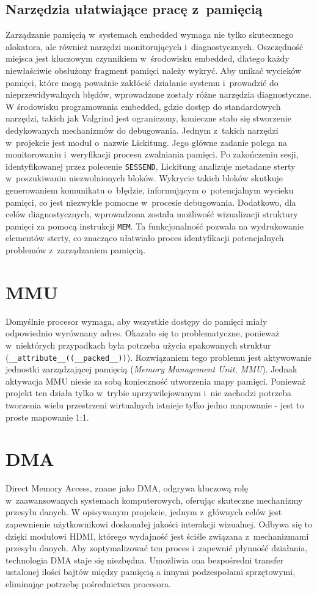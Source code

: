 \documentclass[shortabstract]{iithesis}
\begin{document}
\subsection{Narzędzia ułatwiające pracę z~pamięcią}
Zarządzanie pamięcią w~systemach embedded wymaga nie tylko skutecznego alokatora, ale również narzędzi monitorujących i~diagnostycznych. Oszczędność miejsca jest kluczowym czynnikiem w~środowisku embedded, dlatego każdy niewłaściwie obsłużony fragment pamięci należy wykryć. Aby unikać wycieków pamięci, które mogą poważnie zakłócić działanie systemu i~prowadzić do nieprzewidywalnych błędów, wprowadzone zostały różne narzędzia diagnostyczne.
W środowisku programowania embedded, gdzie dostęp do standardowych narzędzi, takich jak Valgrind jest ograniczony, konieczne stało się stworzenie dedykowanych mechanizmów do debugowania. Jednym z~takich narzędzi w~projekcie jest moduł o~nazwie Lickitung. Jego główne zadanie polega na monitorowaniu i~weryfikacji procesu zwalniania pamięci. Po zakończeniu sesji, identyfikowanej przez polecenie \texttt{SESSEND}, Lickitung analizuje metadane sterty w~poszukiwaniu niezwolnionych bloków. Wykrycie takich bloków skutkuje generowaniem komunikatu o~błędzie, informującym o~potencjalnym wycieku pamięci, co jest niezwykle pomocne w~procesie debugowania.
Dodatkowo, dla celów diagnostycznych, wprowadzona została możliwość wizualizacji struktury pamięci za pomocą instrukcji \texttt{MEM}. Ta funkcjonalność pozwala na wydrukowanie elementów sterty, co znacząco ułatwiało proces identyfikacji potencjalnych problemów z~zarządzaniem pamięcią.

\section{MMU}
 Domyślnie procesor wymaga, aby wszystkie dostępy do pamięci miały odpowiednio wyrównany adres. Okazało się to problematyczne, ponieważ w~niektórych przypadkach była potrzeba użycia spakowanych struktur (\texttt{\_\_attribute\_\_((\_\_packed\_\_))}). Rozwiązaniem tego problemu jest aktywowanie jednostki zarządzającej pamięcią (\textit{Memory Management Unit, MMU}). Jednak aktywacja MMU niesie za sobą konieczność utworzenia mapy pamięci. Ponieważ projekt ten działa tylko w~trybie uprzywilejowanym i~nie zachodzi potrzeba tworzenia wielu przestrzeni wirtualnych istnieje tylko jedno mapowanie - jest to proste mapowanie 1:1.

\section{DMA}
Direct Memory Access, znane jako DMA, odgrywa kluczową rolę w~zaawansowanych systemach komputerowych, oferując skuteczne mechanizmy przesyłu danych. W opisywanym projekcie, jednym z~głównych celów jest zapewnienie użytkownikowi doskonałej jakości interakcji wizualnej. Odbywa się to dzięki modułowi HDMI, którego wydajność jest ściśle związana z~mechanizmami przesyłu danych. Aby zoptymalizować ten proces i~zapewnić płynność działania, technologia DMA staje się niezbędna. Umożliwia ona bezpośredni transfer ustalonej ilości bajtów między pamięcią a innymi podzespołami sprzętowymi, eliminując potrzebę pośrednictwa procesora.
\end{document}
